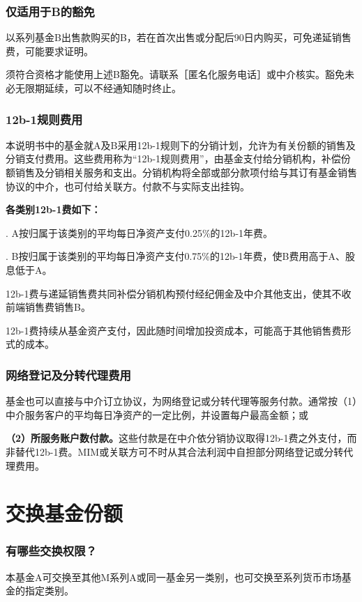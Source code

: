 \documentclass[UTF8,fontset=none,11pt,a4paper]{ctexart}
\begin{document}
\subsubsection*{仅适用于B的豁免}
以系列基金B出售款购买的B，若在首次出售或分配后90日内购买，可免递延销售费，可能要求证明。

须符合资格才能使用上述B豁免。请联系［匿名化服务电话］或中介核实。豁免未必无限期延续，可以不经通知随时终止。

\subsubsection*{12b-1规则费用}\label{unitU649}
本说明书中的基金就A及B采用12b-1规则下的分销计划，允许为有关份额的销售及分销支付费用。这些费用称为“12b-1规则费用”，由基金支付给分销机构，补偿份额销售及分销相关服务和支出。分销机构将全部或部分款项付给与其订有基金销售协议的中介，也可付给关联方。付款不与实际支出挂钩。

\textbf{各类别12b-1费如下：}

. A按归属于该类别的平均每日净资产支付0.25\%的12b-1年费。


. B按归属于该类别的平均每日净资产支付0.75\%的12b-1年费，使B费用高于A、股息低于A。


12b-1费与递延销售费共同补偿分销机构预付经纪佣金及中介其他支出，使其不收前端销售费销售B。

12b-1费持续从基金资产支付，因此随时间增加投资成本，可能高于其他销售费形式的成本。

\subsubsection*{网络登记及分转代理费用}\label{unitU658}
基金也可以直接与中介订立协议，为网络登记或分转代理等服务付款。通常按（1）中介服务客户的平均每日净资产的一定比例，并设置每户最高金额；或

\textbf{（2）所服务账户数付款。}这些付款是在中介依分销协议取得12b-1费之外支付，而非替代12b-1费。MIM或关联方可不时从其合法利润中自担部分网络登记或分转代理费用。

\section*{交换基金份额}\label{unitU661}
\subsubsection*{有哪些交换权限？}
本基金A可交换至其他M系列A或同一基金另一类别，也可交换至系列货币市场基金的指定类别。
\end{document}
